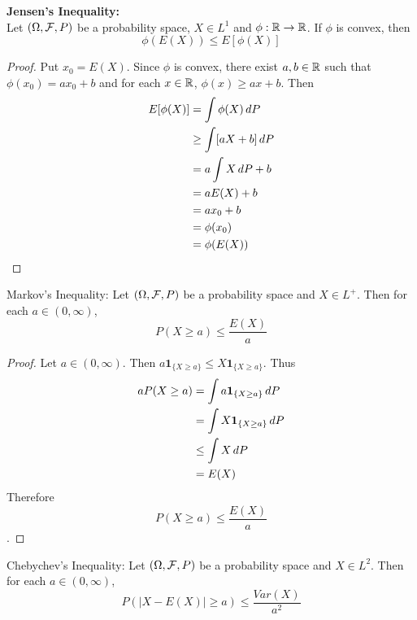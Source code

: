 \documentclass{book}
\begin{document}
	\begin{ex}
		
	\end{ex}
	
	\begin{ex} \textbf{Jensen's Inequality:} \\
		Let $(\Omega, \mathcal{F}, P)$ be a probability space, $X \in L^1$ and $\phi:\mathbb{R} \rightarrow \mathbb{R}$. If $\phi$ is convex, then $$\phi(E(X)) \leq E[\phi(X)]$$
	\end{ex}
	
	\begin{proof}
		Put $x_0 = E(X)$. Since $\phi$ is convex, there exist $a,b \in \mathbb{R}$ such that $\phi(x_0) = ax_0+b$ and for each $x \in \mathbb{R}$, $\phi(x) \geq ax+b$. Then \begin{align*}
			E[\phi(X)] 
			&= \int\phi(X) \, d P \\
			&\geq \int[ aX+b ]\, d P \\
			&= a\int X \, d P +b \\
			&= aE(X) +b \\
			&= ax_0+b \\
			&= \phi(x_0) \\
			&= \phi(E(X))
		\end{align*}
	\end{proof}
	
	\begin{ex}{Markov's Inequality:}
		Let $(\Omega, \mathcal{F}, P)$ be a probability space and $X \in L^+$. Then for each $a \in (0,\infty)$, $$P(X \geq a) \leq \frac{E(X)}{a}$$
	\end{ex}
	
	\begin{proof}
		Let $a \in (0,\infty)$. Then $a \mathbf{1}_{\{X \geq a\}} \leq X \mathbf{1}_{\{X \geq a\}}$. Thus 
		\begin{align*}
			a P(X \geq a) 
			&= \int a \mathbf{1}_{\{X \geq a\}} \, d P\\
			&= \int X \mathbf{1}_{\{X \geq a\}} \, d P\\
			&\leq \int X \, d P \\
			&= E(X)
		\end{align*}
		Therefore $$P(X \geq a) \leq \frac{E(X)}{a}$$. 
	\end{proof}
	
	\begin{ex}{Chebychev's Inequality:}
		Let $(\Omega, \mathcal{F}, P)$ be a probability space and $X \in L^2$. Then for each $a \in (0, \infty)$, $$P(| X - E(X) | \geq a) \leq \frac{Var(X)}{a^2}$$
	\end{ex}
	
\end{document}
